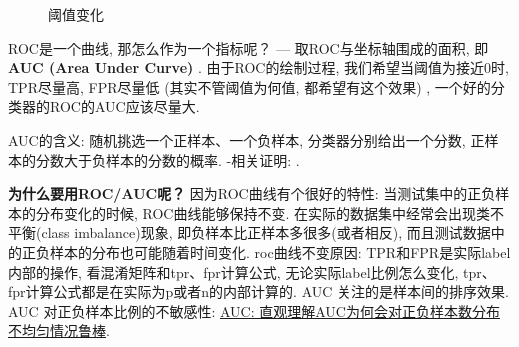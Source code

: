 \begin{figure}[h]
	\centering
	\quad
	\caption{阈值变化}
	\label{fig:threshold-change}
\end{figure}
ROC是一个曲线, 那怎么作为一个指标呢？ --- 取ROC与坐标轴围成的面积, 即\textbf{AUC (Area Under Curve) }. 由于ROC的绘制过程, 我们希望当阈值为接近0时, TPR尽量高, FPR尽量低 (其实不管阈值为何值, 都希望有这个效果) , 一个好的分类器的ROC的AUC应该尽量大. 

AUC的含义: 随机挑选一个正样本、一个负样本, 分类器分别给出一个分数, 正样本的分数大于负样本的分数的概率. -相关证明: \href{http://vividfree.github.io/%E6%9C%BA%E5%99%A8%E5%AD%A6%E4%B9%A0/2015/11/20/understanding-ROC-and-AUC}{\tbc{red}{理解 ROC 和 AUC}}. 

\textbf{为什么要用ROC/AUC呢？}\newline
因为ROC曲线有个很好的特性: 当测试集中的正负样本的分布变化的时候, ROC曲线能够保持不变. 在实际的数据集中经常会出现类不平衡(class imbalance)现象, 即负样本比正样本多很多(或者相反), 而且测试数据中的正负样本的分布也可能随着时间变化. roc曲线不变原因: TPR和FPR是实际label内部的操作, 看混淆矩阵和tpr、fpr计算公式, 无论实际label比例怎么变化, tpr、fpr计算公式都是在实际为p或者n的内部计算的. AUC 关注的是样本间的排序效果. AUC 对正负样本比例的不敏感性: \href{https://blog.csdn.net/Leon_winter/article/details/104673047}{AUC: 直观理解AUC为何会对正负样本数分布不均匀情况鲁棒}. 

